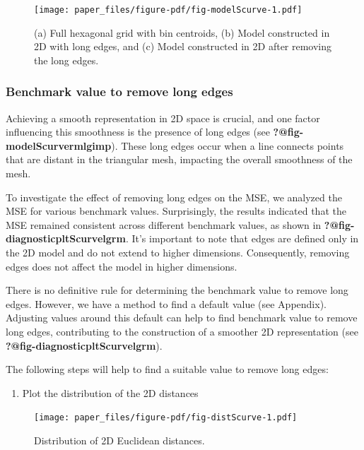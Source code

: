 \documentclass[
  12pt]{article}
\providecommand{\tightlist}{%
  \setlength{\itemsep}{0pt}\setlength{\parskip}{0pt}}\usepackage{longtable,booktabs,array}
\begin{document}
\begin{figure}[H]

{\centering \texttt{[image: paper\_files/figure-pdf/fig-modelScurve-1.pdf]}

}

\caption{\label{fig-modelScurve}(a) Full hexagonal grid with bin
centroids, (b) Model constructed in 2D with long edges, and (c) Model
constructed in 2D after removing the long edges.}

\end{figure}

\hypertarget{benchmark-value-to-remove-long-edges}{%
\subsubsection{Benchmark value to remove long
edges}\label{benchmark-value-to-remove-long-edges}}

Achieving a smooth representation in 2D space is crucial, and one factor
influencing this smoothness is the presence of long edges (see
\textbf{?@fig-modelScurvermlgimp}). These long edges occur when a line
connects points that are distant in the triangular mesh, impacting the
overall smoothness of the mesh.

To investigate the effect of removing long edges on the MSE, we analyzed
the MSE for various benchmark values. Surprisingly, the results
indicated that the MSE remained consistent across different benchmark
values, as shown in \textbf{?@fig-diagnosticpltScurvelgrm}. It's
important to note that edges are defined only in the 2D model and do not
extend to higher dimensions. Consequently, removing edges does not
affect the model in higher dimensions.

There is no definitive rule for determining the benchmark value to
remove long edges. However, we have a method to find a default value
(see Appendix). Adjusting values around this default can help to find
benchmark value to remove long edges, contributing to the construction
of a smoother 2D representation (see
\textbf{?@fig-diagnosticpltScurvelgrm}).

The following steps will help to find a suitable value to remove long
edges:

\begin{enumerate}
\def\labelenumi{\arabic{enumi}.}
\tightlist
\item
  Plot the distribution of the 2D distances
\end{enumerate}

\begin{figure}

{\centering \texttt{[image: paper\_files/figure-pdf/fig-distScurve-1.pdf]}

}

\caption{\label{fig-distScurve}Distribution of 2D Euclidean distances.}

\end{figure}
\end{document}
